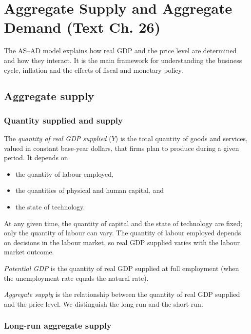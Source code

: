 \chapter{Aggregate Supply and Aggregate Demand (Text Ch. 26)}

The AS--AD model explains how real GDP and the price level are determined and how they
interact. It is the main framework for understanding the business cycle, inflation and
the effects of fiscal and monetary policy.

\section{Aggregate supply}

\subsection{Quantity supplied and supply}

The \emph{quantity of real GDP supplied} ($Y$) is the total quantity of goods and
services, valued in constant base-year dollars, that firms plan to produce during a
given period. It depends on
\begin{itemize}
  \item the quantity of labour employed,
  \item the quantities of physical and human capital, and
  \item the state of technology.
\end{itemize}
At any given time, the quantity of capital and the state of technology are fixed; only the
quantity of labour can vary. The quantity of labour employed depends on decisions in the
labour market, so real GDP supplied varies with the labour market outcome.

\begin{definition}
\emph{Potential GDP} is the quantity of real GDP supplied at full employment (when the
unemployment rate equals the natural rate).
\end{definition}

\begin{definition}
\emph{Aggregate supply} is the relationship between the quantity of real GDP supplied and
the price level. We distinguish the long run and the short run.
\end{definition}

\subsection{Long-run aggregate supply}

